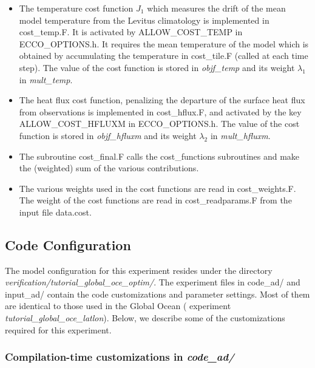 \begin{itemize}

\item The temperature cost function $J_1$ which measures the drift of the mean
model temperature from the Levitus climatology is implemented in cost\_temp.F.
It is activated by ALLOW\_COST\_TEMP in ECCO\_OPTIONS.h. It requires the mean
temperature of the model which is obtained by accumulating the temperature in
cost\_tile.F (called at each time step).
The value of the cost function is stored in {\it objf\_temp} and its weight
$\lambda_1$ in {\it mult\_temp}.

\item The heat flux cost function, penalizing the departure of the surface
heat flux from observations is implemented in cost\_hflux.F, and activated by
the key ALLOW\_COST\_HFLUXM in ECCO\_OPTIONS.h. The value of the cost
function is stored in {\it objf\_hfluxm} and its weight $\lambda_2$ in
{\it mult\_hfluxm}.

\item The subroutine cost\_final.F calls the cost\_functions subroutines
and make the (weighted) sum of the various contributions.

\item The various weights used in the cost functions are read in
cost\_weights.F. The weight of the cost functions are read in
cost\_readparams.F from the input file data.cost.    

\end{itemize}


\subsection{Code Configuration}
\label{sec:eg_globest_code_config}

The model configuration for this experiment resides under the directory
{\it verification/tutorial\_global\_oce\_optim/}.  The experiment files in
code\_ad/ and input\_ad/ contain the code customizations and parameter
settings. Most of them are identical to those used in the Global Ocean
( experiment {\it  tutorial\_global\_oce\_latlon}). Below, we describe some of
the customizations required for this experiment.

\subsubsection{Compilation-time customizations in {\it code\_ad/}}

